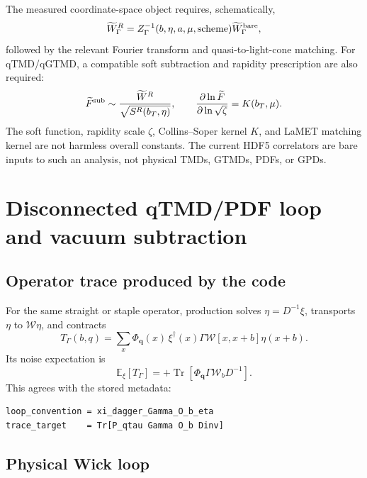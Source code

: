 \documentclass[11pt,a4paper]{article}
\numberwithin{equation}{section}
\newcommand{\Tr}{\operatorname{Tr}}
\newcommand{\cW}{\mathcal{W}}
\begin{document}
The measured coordinate-space object requires, schematically,
\begin{equation}
 \widetilde W_\Gamma^{R}
 =Z_\Gamma^{-1}(b,\eta,a,\mu,\text{scheme})
 \widetilde W_\Gamma^{\rm bare},
\end{equation}
followed by the relevant Fourier transform and quasi-to-light-cone matching.
For qTMD/qGTMD, a compatible soft subtraction and rapidity prescription are
also required:
\begin{equation}
 \widetilde F^{\rm sub}
 \sim
 \frac{\widetilde W^{R}}
      {\sqrt{S^{R}(b_T,\eta)}} ,
\qquad
 \frac{\partial\ln\widetilde F}{\partial\ln\sqrt\zeta}
 =K(b_T,\mu).
\end{equation}
The soft function, rapidity scale \(\zeta\), Collins--Soper kernel \(K\), and
LaMET matching kernel are not harmless overall constants.  The current HDF5
correlators are bare inputs to such an analysis, not physical TMDs, GTMDs,
PDFs, or GPDs.

\section{Disconnected qTMD/PDF loop and vacuum subtraction}

\subsection{Operator trace produced by the code}

For the same straight or staple operator, production solves
\(\eta=D^{-1}\xi\), transports \(\eta\) to
\(\cW\eta\), and contracts
\begin{equation}
 T_\Gamma(b,q)
 =\sum_x\Phi_{\boldsymbol q}(x)\,
 \xi^\dagger(x)\Gamma\cW[x,x+b]\eta(x+b).
 \label{eq:disc-positive-trace}
\end{equation}
Its noise expectation is
\begin{equation}
 \mathbb E_\xi[T_\Gamma]
 =+\Tr\left[
 \Phi_{\boldsymbol q}\Gamma\cW_bD^{-1}
 \right].
 \label{eq:disc-trace-target}
\end{equation}
This agrees with the stored metadata:
\begin{lstlisting}
loop_convention = xi_dagger_Gamma_O_b_eta
trace_target    = Tr[P_qtau Gamma O_b Dinv]
\end{lstlisting}

\subsection{Physical Wick loop}
\end{document}
